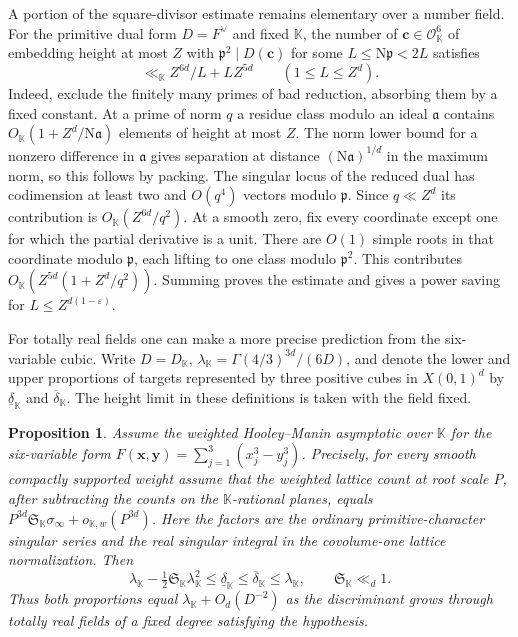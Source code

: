 \documentclass[11pt,letterpaper]{article}
\newtheorem{proposition}[proposition]{Proposition}
\theoremstyle{definition}
\numberwithin{equation}{section}
\begin{document}
A portion of the square-divisor estimate remains elementary over a
number field. For the primitive dual form $D=F^\vee$ and fixed $\mathbb K$,
the number of $\mathbf c\in\mathcal O_{\mathbb K}^6$ of embedding height
at most $Z$ with $\mathfrak p^2\mid D(\mathbf c)$ for some
$L\le\mathrm N\mathfrak p<2L$ satisfies
\[
 \ll_{\mathbb K} Z^{6d}/L+L Z^{5d}\qquad (1\le L\le Z^d).
\]
Indeed, exclude the finitely many primes of bad reduction, absorbing them
by a fixed constant. At a prime of norm $q$ a residue class modulo an
ideal $\mathfrak a$ contains $O_{\mathbb K}(1+Z^d/\mathrm N\mathfrak a)$
elements of height at most $Z$. The norm lower bound for a nonzero
difference in $\mathfrak a$ gives separation at distance
$(\mathrm N\mathfrak a)^{1/d}$ in the maximum norm, so this follows by
packing. The singular locus of the reduced dual has codimension at least
two and $O(q^4)$ vectors modulo $\mathfrak p$. Since $q\ll Z^d$ its
contribution is $O_{\mathbb K}(Z^{6d}/q^2)$. At a smooth zero, fix every
coordinate except one for which the partial derivative is a unit. There
are $O(1)$ simple roots in that coordinate modulo $\mathfrak p$, each
lifting to one class modulo $\mathfrak p^2$. This contributes
$O_{\mathbb K}(Z^{5d}(1+Z^d/q^2))$. Summing proves the estimate and gives
a power saving for $L\le Z^{d(1-\varepsilon)}$.

For totally real fields one can make a more precise prediction from the
six-variable cubic. Write $D=D_{\mathbb K}$,
$\lambda_{\mathbb K}=\Gamma(4/3)^{3d}/(6D)$, and denote the lower and
upper proportions of targets represented by three positive cubes in
$X(0,1)^d$ by $\underline\delta_{\mathbb K}$ and $\overline\delta_{\mathbb K}$.
The height limit in these definitions is taken with the field fixed.

\begin{proposition}\label{nf3:conditional}
Assume the weighted Hooley--Manin asymptotic over $\mathbb K$ for the
six-variable form $F(\mathbf x,\mathbf y)=\sum_{j=1}^3(x_j^3-y_j^3)$.
Precisely, for every smooth compactly supported weight assume that the
weighted lattice count at root scale $P$, after subtracting the counts on
the $\mathbb K$-rational planes, equals
$P^{3d}\mathfrak S_{\mathbb K}\sigma_\infty+o_{\mathbb K,w}(P^{3d})$.
Here the factors are the ordinary primitive-character singular series and
the real singular integral in the covolume-one lattice normalization.
Then
\[
 \lambda_{\mathbb K}-\tfrac12\mathfrak S_{\mathbb K}\lambda_{\mathbb K}^2
 \le\underline\delta_{\mathbb K}\le\overline\delta_{\mathbb K}
 \le\lambda_{\mathbb K},\qquad \mathfrak S_{\mathbb K}\ll_d1 .
\]
Thus both proportions equal $\lambda_{\mathbb K}+O_d(D^{-2})$ as the
discriminant grows through totally real fields of a fixed degree
satisfying the hypothesis.
\end{proposition}
\end{document}
